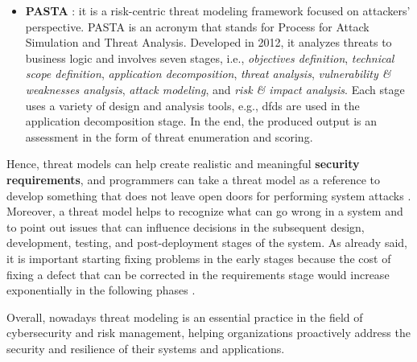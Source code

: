 \begin{itemize}
    \item \textbf{PASTA} \cite{shevchenko2018threat, ucedavelez2015intro}: it is a risk-centric threat modeling framework focused on attackers' perspective. PASTA is an acronym that stands for Process for Attack Simulation and Threat Analysis. Developed in 2012, it analyzes threats to business logic \cite{kim2022stride} and involves seven stages, i.e., \textit{objectives definition}, \textit{ technical scope definition}, \textit{application decomposition}, \textit{threat analysis}, \textit{vulnerability \& weaknesses analysis}, \textit{attack modeling}, and \textit{risk \& impact analysis}. Each stage uses a variety of design and analysis tools, e.g., \glspl{dfd} are used in the application decomposition stage. In the end, the produced output is an assessment in the form of threat enumeration and scoring.     
\end{itemize}
Hence, threat models can help create realistic and meaningful \textbf{security requirements}, and programmers can take a threat model as a reference to develop something that does not leave open doors for performing system attacks \cite{messe2020asset}. Moreover, a threat model helps to recognize what can go wrong in a system and to point out issues that can influence decisions in the subsequent design, development, testing, and post-deployment stages of the system.
As already said, it is important starting fixing problems in the early stages because the cost of fixing a defect that can be corrected in the requirements stage would increase exponentially in the following phases \cite{lazic2008cost}.

Overall, nowadays threat modeling is an essential practice in the field of cybersecurity and risk management, helping organizations proactively address the security and resilience of their systems and applications.